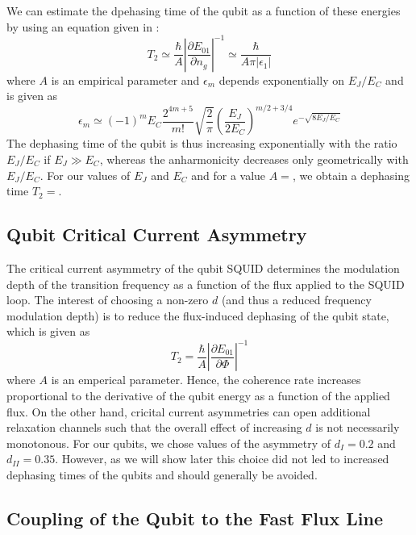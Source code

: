 We can estimate the dpehasing time of the qubit as a function of these energies by using an equation given in \cite{koch_charge-insensitive_2007}:
%
\begin{equation}
T_2 \simeq \frac{\hbar}{A}\left|\frac{\partial E_{01}}{\partial n_g}\right|^{-1} \simeq \frac{\hbar}{A\pi |\epsilon_1|}
\end{equation}
%
where $A$ is an empirical parameter and $\epsilon_m$ depends exponentially on $E_J/E_C$ and is given as
%
\begin{equation}
\epsilon_m \simeq (-1)^m E_C \frac{2^{4m+5}}{m!}\sqrt{\frac{2}{\pi}}\left(\frac{E_J}{2E_C}\right)^{m/2+3/4}e^{-\sqrt{8 E_J / E_C}}
\end{equation}
%
The dephasing time of the qubit is thus increasing exponentially with the ratio $E_J/E_C$ if $E_J \gg E_C$, whereas the anharmonicity decreases only geometrically with $E_J/E_C$. For our values of $E_J$ and $E_C$ and for a value $A=$, we obtain a dephasing time $T_2=$.

\subsection{Qubit Critical Current Asymmetry}

The critical current asymmetry of the qubit SQUID determines the modulation depth of the transition frequency as a function of the flux applied to the SQUID loop. The interest of choosing a non-zero $d$ (and thus a reduced frequency modulation depth) is to reduce the flux-induced dephasing of the qubit state, which is given as \citep{koch_charge-insensitive_2007}
%
\begin{equation}
T_2 = \frac{\hbar}{A}\left|\frac{\partial E_{01}}{\partial \Phi}\right|^{-1}
\end{equation}
%
where $A$ is an emperical parameter. Hence, the coherence rate increases proportional to the derivative of the qubit energy as a function of the applied flux. On the other hand, cricital current asymmetries can open additional relaxation channels \citep{} such that the overall effect of increasing $d$ is not necessarily monotonous. For our qubits, we chose values of the asymmetry of $d_{I}=0.2$ and $d_{II}=0.35$. However, as we will show later this choice did not led to increased dephasing times of the qubits and should generally be avoided.

\subsection{Coupling of the Qubit to the Fast Flux Line}

